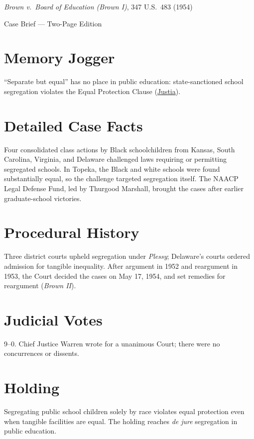\documentclass[12pt]{article}
\begin{document}
\begin{center}
{\LARGE \textit{Brown v.\ Board of Education (Brown I)}, 347 U.S.\ 483 (1954)\par}
\vspace{0.5em}
{\large Case Brief --- Two-Page Edition\par}
\end{center}

\section{Memory Jogger}
``Separate but equal'' has no place in public education: state-sanctioned school segregation violates the Equal Protection Clause (\href{https://supreme.justia.com/cases/federal/us/347/483/}{Justia}).

\section{Detailed Case Facts}
Four consolidated class actions by Black schoolchildren from Kansas, South Carolina, Virginia, and Delaware challenged laws requiring or permitting segregated schools. In Topeka, the Black and white schools were found substantially equal, so the challenge targeted segregation itself. The NAACP Legal Defense Fund, led by Thurgood Marshall, brought the cases after earlier graduate-school victories.

\section{Procedural History}
Three district courts upheld segregation under \textit{Plessy}; Delaware's courts ordered admission for tangible inequality. After argument in 1952 and reargument in 1953, the Court decided the cases on May 17, 1954, and set remedies for reargument (\textit{Brown II}).

\section{Judicial Votes}
9--0. Chief Justice Warren wrote for a unanimous Court; there were no concurrences or dissents.

\section{Holding}
Segregating public school children solely by race violates equal protection even when tangible facilities are equal. The holding reaches \textit{de jure} segregation in public education.
\end{document}
